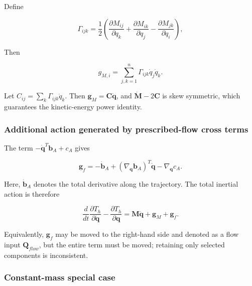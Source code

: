 Define

\begin{equation}
\label{eq:galerkin-2-87}
\Gamma_{ijk} = \frac{1}{2}\left( \frac{\partial M_{ij}}{\partial q_{k}} + \frac{\partial M_{ik}}{\partial q_{j}} - \frac{\partial M_{jk}}{\partial q_{i}} \right),
\end{equation}

Then

\begin{equation}
\label{eq:galerkin-2-88}
g_{M,i} = \sum_{j,k = 1}^{n}\Gamma_{ijk}{\dot{q}}_{j}{\dot{q}}_{k}.
\end{equation}

Let \(C_{ij} = \sum_{k}^{}\Gamma_{ijk}{\dot{q}}_{k}\). Then \(\mathbf{g}_{M} = \mathbf{C}\dot{\mathbf{q}}\), and \(\dot{\mathbf{M}} - 2\mathbf{C}\) is skew symmetric, which guarantees the kinetic-energy power identity.

\subsubsection{Additional action generated by prescribed-flow cross terms}\label{sec:galerkin-2-6-3}

The term \(- {\dot{\mathbf{q}}}^{T}\mathbf{b}_{A} + c_{A}\) gives

\begin{equation}
\label{eq:galerkin-2-89}
\boxed{\mathbf{g}_{f} = - {\dot{\mathbf{b}}}_{A} + \left( \nabla_{\mathbf{q}}\mathbf{b}_{A} \right)^{T}\dot{\mathbf{q}} - \nabla_{\mathbf{q}}c_{A}.}
\end{equation}

Here, \({\dot{\mathbf{b}}}_{A}\) denotes the total derivative along the trajectory. The total inertial action is therefore

\begin{equation}
\label{eq:galerkin-2-90}
\boxed{\frac{d}{dt}\frac{\partial T_{h}}{\partial\dot{\mathbf{q}}} - \frac{\partial T_{h}}{\partial\mathbf{q}} = \mathbf{M}\ddot{\mathbf{q}} + \mathbf{g}_{M} + \mathbf{g}_{f}.}
\end{equation}

Equivalently, \(\mathbf{g}_{f}\) may be moved to the right-hand side and denoted as a flow input \(\mathbf{Q}_{flow}\), but the entire term must be moved; retaining only selected components is inconsistent.

\subsubsection{Constant-mass special case}\label{sec:galerkin-2-6-4}

